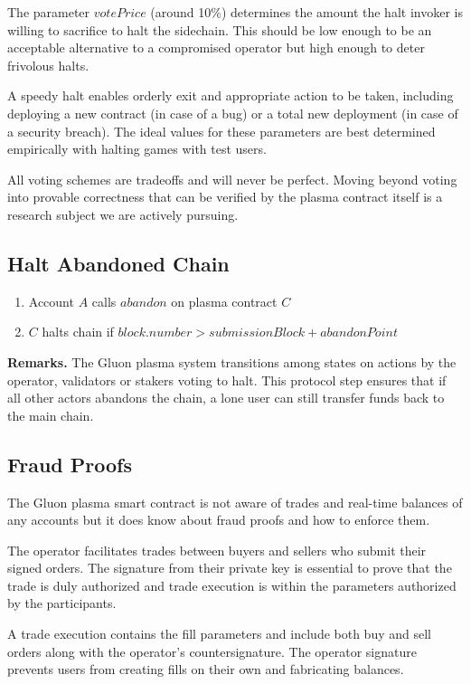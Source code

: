 \documentclass[12pt,a4paper]{article}
\begin{document}
The parameter $votePrice$ (around 10\%) determines the amount the halt invoker is willing to sacrifice to halt the sidechain. This should be low enough to be an acceptable alternative to a compromised operator but high enough to deter frivolous halts.

A speedy halt enables orderly exit and appropriate action to be taken, including deploying a new contract (in case of a bug) or a total new deployment (in case of a security breach). The ideal values for these parameters are best determined empirically with halting games with test users.

All voting schemes are tradeoffs and will never be perfect. Moving beyond voting into provable correctness that can be verified by the plasma contract itself is a research subject we are actively pursuing.

\subsection{Halt Abandoned Chain}\label{gp:abandon}
\begin{mdframed}
\begin{enumerate}
    \item Account $A$ calls $abandon$ on  plasma contract $C$
    \item $C$ halts chain if \(block.number > submissionBlock + abandonPoint\)
\end{enumerate}
\end{mdframed}

\textbf{Remarks.} The Gluon plasma system transitions among states on actions by the operator, validators or stakers voting to halt. This protocol step ensures that if all other actors  abandons the chain, a lone user can still transfer funds back to the main chain.

\subsection{Fraud Proofs}
The Gluon plasma smart contract is not aware of trades and real-time balances of any accounts but it does know about fraud proofs and how to enforce them. 

The operator facilitates trades between buyers and sellers who submit their signed orders. The signature from their private key is essential to prove that the trade is duly authorized and trade execution is within the parameters authorized by the participants.

A trade execution contains the fill parameters and include both buy and sell orders along with the operator’s countersignature. The operator signature prevents users from creating fills on their own and fabricating balances. 
\end{document}
